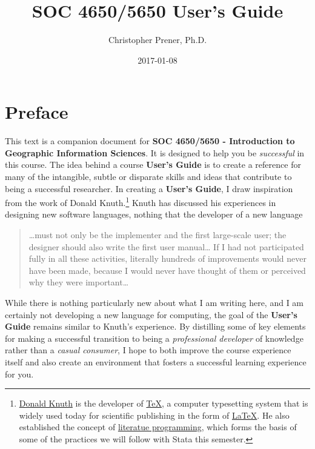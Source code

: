\documentclass[]{book}
\title{SOC 4650/5650 User's Guide}
\author{Christopher Prener, Ph.D.}
\date{2017-01-08}
\let\rmarkdownfootnote\footnote%
\def\footnote{\protect\rmarkdownfootnote}
\begin{document}
\maketitle

{
\setcounter{tocdepth}{1}
\tableofcontents
}
\chapter*{Preface}\label{preface}

This text is a companion document for \textbf{SOC 4650/5650 -
Introduction to Geographic Information Sciences}. It is designed to help
you be \emph{successful} in this course. The idea behind a course
\textbf{User's Guide} is to create a reference for many of the
intangible, subtle or disparate skills and ideas that contribute to
being a successful researcher. In creating a \textbf{User's Guide}, I
draw inspiration from the work of Donald Knuth.\footnote{\href{https://en.wikipedia.org/wiki/Donald_Knuth}{Donald
  Knuth} is the developer of
  \href{https://en.wikipedia.org/wiki/TeX}{TeX}, a computer typesetting
  system that is widely used today for scientific publishing in the form
  of \href{https://en.wikipedia.org/wiki/LaTeX}{LaTeX}. He also
  established the concept of
  \href{https://en.wikipedia.org/wiki/Literate_programming}{literatue
  programming}, which forms the basis of some of the practices we will
  follow with Stata this semester.} Knuth has discussed his experiences
in designing new software languages, nothing that the developer of a new
language

\begin{quote}
\ldots{}must not only be the implementer and the first large-scale user;
the designer should also write the first user manual\ldots{} If I had
not participated fully in all these activities, literally hundreds of
improvements would never have been made, because I would never have
thought of them or perceived why they were important\ldots{}
\end{quote}

While there is nothing particularly new about what I am writing here,
and I am certainly not developing a new language for computing, the goal
of the \textbf{User's Guide} remains similar to Knuth's experience. By
distilling some of key elements for making a successful transition to
being a \emph{professional developer} of knowledge rather than a
\emph{casual consumer}, I hope to both improve the course experience
itself and also create an environment that fosters a successful learning
experience for you.
\end{document}
